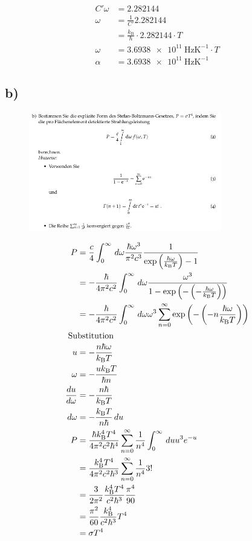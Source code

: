 \begin{align}
    C' \omega &= 2.282144\\
    \omega &= \frac{1}{C'} 2.282144\\
     &= \frac{k_{\text{B}}}{\hbar}\cdot 2.282144\cdot T\\
    \omega &= \SI{3,6938e11}{\hertz\kelvin\tothe{-1}}\cdot T\\
    \alpha &= \SI{3,6938e11}{\hertz\kelvin\tothe{-1}}
\end{align}

\subsection{b)}

\begin{figure}[H]
    \centering
    \includegraphics[width=0.75\textwidth]{images/Aufgabe_1b.jpg}
    \label{fig:3}
\end{figure}

\begin{align}
    P &= \frac{c}{4} \int_0^{\infty} \, d \omega \frac{\hbar \omega ^3}{\pi ^2c^3} \frac{1}{\exp\left(\frac{\hbar \omega}{k_{\text{B}}T}\right)-1}\\
    &= \--\frac{\hbar}{4 \pi ^2 c^2} \int_0^ {\infty} \, d \omega \frac{\omega ^3}{1-\exp \left(\-- \left(\--\frac{\hbar \omega}{k_{\text{B}}T} \right)\right)}\\
    &= \-- \frac{\hbar}{4\pi ^2 c^2} \int_0^ {\infty} \, d \omega \omega ^3 \sum_{n=0}^{\infty} \exp\left(\--\left(\--n\frac{\hbar \omega}{k_{\text{B}}T}\right)\right)\\
    \intertext{
        Substitution
    }
    u &= \--\frac{n \hbar \omega}{k_{\text{B}}T}\\
    \omega &= \--\frac{u k_{\text{B}}T}{\hbar n}\\
    \frac{du}{d \omega}&= \--\frac{n \hbar}{k_{\text{B}}T}\\
    d \omega &= \--\frac{k_{\text{B}}T}{n \hbar} \,d u\\
    P&= \frac{\hbar k_{\text{B}}^4 T^4}{4 \pi ^2 c^2 \hbar ^4} \sum_{n=0}^ {\infty} \frac{1}{n^4}\int_0^{\infty} \, du u^3 e^ {-u}\\
    &= \frac{ k_{\text{B}}^4 T^4}{4 \pi ^2 c^2 \hbar ^3} \sum_{n=0}^ {\infty} \frac{1}{n^4} 3!\\
    &= \frac{3}{2 \pi ^2}\frac{ k_{\text{B}}^4 T^4}{ c^2 \hbar ^3} \frac{\pi ^4}{90}\\
    &= \frac{\pi ^2}{60} \frac{ k_{\text{B}}^4}{ c^2 \hbar ^3} T^4 \\
    &= \sigma T^4
\end{align}

